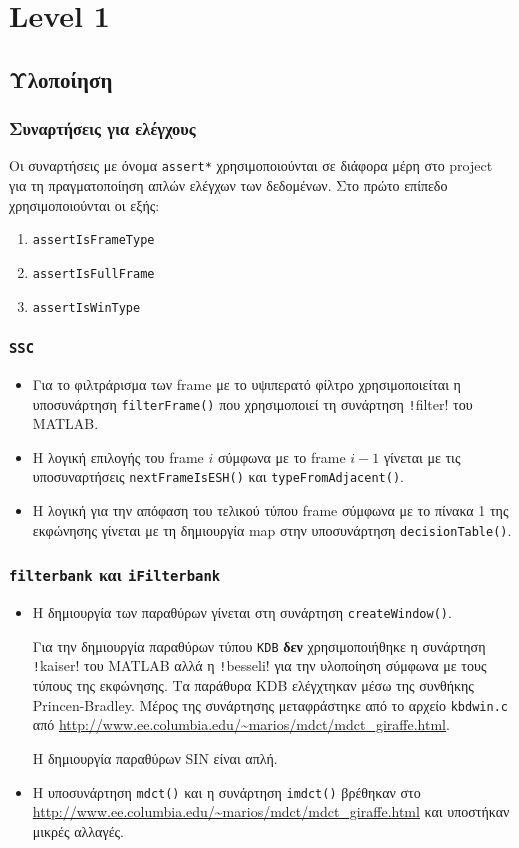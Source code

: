 \section{Level 1}
\subsection{Υλοποίηση}
\subsubsection{Συναρτήσεις για ελέγχους}
Οι συναρτήσεις με όνομα \texttt{assert*} χρησιμοποιούνται σε διάφορα μέρη στο project για τη πραγματοποίηση απλών ελέγχων των δεδομένων.
Στο πρώτο επίπεδο χρησιμοποιούνται οι εξής:
\begin{enumerate}
\item \texttt{assertIsFrameType}
\item \texttt{assertIsFullFrame}
\item \texttt{assertIsWinType}
\end{enumerate}

\subsubsection{\texttt{SSC}}
\begin{itemize}
\item Για το φιλτράρισμα των frame με το υψιπερατό φίλτρο χρησιμοποιείται η υποσυνάρτηση \texttt{filterFrame()} που χρησιμοποιεί τη συνάρτηση \texttt!filter! του MATLAB.
\item Η λογική επιλογής του frame $i$ σύμφωνα με το frame $i-1$ γίνεται με τις υποσυναρτήσεις \texttt{nextFrameIsESH()} και \texttt{typeFromAdjacent()}.
\item Η λογική για την απόφαση του τελικού τύπου frame σύμφωνα με το πίνακα 1 της εκφώνησης γίνεται με τη δημιουργία map στην υποσυνάρτηση \texttt{decisionTable()}.
\end{itemize}

\subsubsection{\texttt{filterbank} και \texttt{iFilterbank}}
\begin{itemize}
\item Η δημιουργία των παραθύρων γίνεται στη συνάρτηση \texttt{createWindow()}.

Για την δημιουργία παραθύρων τύπου \texttt{KDB} \textbf{δεν} χρησιμοποιήθηκε η συνάρτηση \texttt!kaiser! του MATLAB αλλά η \texttt!besseli! για την υλοποίηση σύμφωνα με τους τύπους της εκφώνησης.
Τα παράθυρα KDB ελέγχτηκαν μέσω της συνθήκης Princen-Bradley.
Μέρος της συνάρτησης μεταφράστηκε από το αρχείο \texttt{kbdwin.c} από \url{http://www.ee.columbia.edu/~marios/mdct/mdct_giraffe.html}.

Η δημιουργία παραθύρων SIN είναι απλή.

\item Η υποσυνάρτηση \texttt{mdct()} και η συνάρτηση \texttt{imdct()} βρέθηκαν στο \url{http://www.ee.columbia.edu/~marios/mdct/mdct_giraffe.html} και υποστήκαν μικρές αλλαγές.
\end{itemize}

